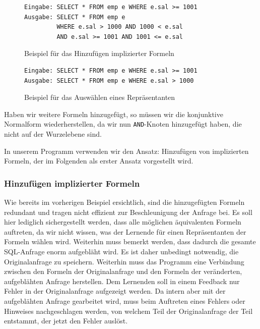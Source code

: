\begin{figure}[H]
\centering
\begin{verbatim}
Eingabe: SELECT * FROM emp e WHERE e.sal >= 1001
Ausgabe: SELECT * FROM emp e 
         WHERE e.sal > 1000 AND 1000 < e.sal
         AND e.sal >= 1001 AND 1001 <= e.sal
\end{verbatim}
\caption{Beispiel für das Hinzufügen implizierter Formeln}
\label{fig:sampleadd}
\end{figure}

\begin{figure}[H]
\centering
\begin{verbatim}
Eingabe: SELECT * FROM emp e WHERE e.sal >= 1001
Ausgabe: SELECT * FROM emp e WHERE e.sal > 1000
\end{verbatim}
\caption{Beispiel für das Auswählen eines Repräsentanten}
\label{fig:samplerep}
\end{figure}

Haben wir weitere Formeln hinzugefügt, so müssen wir die konjunktive Normalform wiederherstellen, da wir nun \verb|AND|-Knoten hinzugefügt haben, die nicht auf der Wurzelebene sind. 

In unserem Programm verwenden wir den Ansatz: Hinzufügen von implizierten Formeln, der im Folgenden als erster Ansatz vorgestellt wird.

\subsubsection{Hinzufügen implizierter Formeln}
\label{subsubsec:implicitformulas}

Wie bereits im vorherigen Beispiel ersichtlich, sind die hinzugefügten Formeln redundant und tragen nicht effizient zur Beschleunigung der Anfrage bei. Es soll hier lediglich sichergestellt werden, dass alle möglichen äquivalenten Formeln auftreten, da wir nicht wissen, was der Lernende für einen Repräsentanten der Formeln wählen wird. Weiterhin muss bemerkt werden, dass dadurch die gesamte SQL-Anfrage enorm aufgebläht wird. Es ist daher unbedingt notwendig, die Originalanfrage zu speichern. Weiterhin muss das Programm eine Verbindung zwischen den Formeln der Originalanfrage und den Formeln der veränderten, aufgeblähten Anfrage herstellen. Dem Lernenden soll in einem Feedback nur Fehler in der Originalanfrage aufgezeigt werden. Da intern aber mit der aufgeblähten Anfrage gearbeitet wird, muss beim Auftreten eines Fehlers oder Hinweises nachgeschlagen werden, von welchem Teil der Originalanfrage der Teil entstammt, der jetzt den Fehler auslöst.

